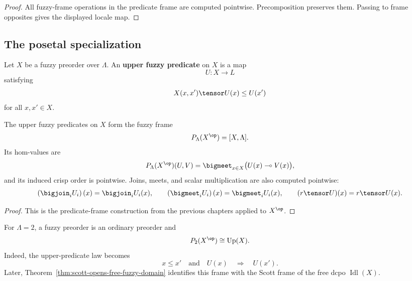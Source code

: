 \begin{proof}
All fuzzy-frame operations in the predicate frame are computed pointwise.
Precomposition preserves them.  Passing to frame opposites gives the displayed
locale map.
\end{proof}

\subsection{The posetal specialization}
\label{subsec:upper-predicates-posetal}

\begin{definition}
\label{def:upper-fuzzy-predicate-posetal}
Let \(X\) be a fuzzy preorder over \(\Lambda\).  An \textbf{upper fuzzy predicate}
on \(X\) is a map
\[
    U:X\to L
\]
satisfying
\[
    X(x,x')\tensor U(x)\leq U(x')
\]
for all \(x,x'\in X\).
\end{definition}

\begin{proposition}
\label{prop:upper-alexandrov-fuzzy-frame}
The upper fuzzy predicates on \(X\) form the fuzzy frame
\[
    P_\Lambda(X^{\op})
    =
    [X,\Lambda].
\]
Its hom-values are
\[
    P_\Lambda(X^{\op})(U,V)
    =
    \bigmeet_{x\in X}
    \bigl(U(x)\multimap V(x)\bigr),
\]
and its induced crisp order is pointwise.  Joins, meets, and scalar multiplication
are also computed pointwise:
\[
    \left(\bigjoin_i U_i\right)(x)=\bigjoin_i U_i(x),
    \qquad
    \left(\bigmeet_i U_i\right)(x)=\bigmeet_i U_i(x),
    \qquad
    (r\tensor U)(x)=r\tensor U(x).
\]
\end{proposition}

\begin{proof}
This is the predicate-frame construction from the previous chapters applied to
\(X^{\op}\).
\end{proof}

\begin{example}
\label{ex:upper-predicates-crisp}
For \(\Lambda=2\), a fuzzy preorder is an ordinary preorder and
\[
    P_2(X^{\op})
    \cong
    \operatorname{Up}(X).
\]
Indeed, the upper-predicate law becomes
\[
    x\leq x'
    \quad\text{and}\quad
    U(x)
    \quad\Longrightarrow\quad
    U(x').
\]
Later, Theorem~\ref{thm:scott-opens-free-fuzzy-domain} identifies this frame with
the Scott frame of the free dcpo \(\operatorname{Idl}(X)\).
\end{example}

